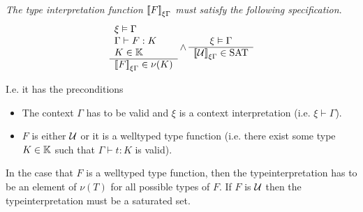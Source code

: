 \begin{definition}
    \label{SpecificationTypeInterpretation}
    \emph{The type interpretation function ${{{[\![} F {]\!]}}_{\xi\Gamma}}$ must
    satisfy the following specification}.
    $$
    \begin{array}{l} 
        \xi \vDash \Gamma
        \\
        \Gamma \vdash F : K
        \\
        K \in \mathbb{K}
     \\ \hline 
        {{{[\![}F {]\!]}}_{\xi\Gamma}} \in \nu(K)
    \end{array}
    \land
    \begin{array}{c} 
        \xi \vDash \Gamma
     \\ \hline 
        {{{[\![}{\cal U}{]\!]}}_{\xi\Gamma}} \in \text{SAT}
    \end{array}
    $$

    I.e. it has the preconditions
    \begin{itemize}
    \item The context $\Gamma$ has to be valid and $\xi$ is a context
        interpretation (i.e. $\xi \vdash \Gamma$).

    \item $F$ is either ${\cal U}$ or it is a welltyped type function (i.e. there
        exist some type $K \in \mathbb{K}$ such that $\Gamma \vdash t : K$ is
            valid).
    \end{itemize}

    In the case that $F$ is a welltyped type function, then the
    typeinterpretation has to be an element of $\nu(T)$ for all possible types
    of $F$. If $F$ is ${\cal U}$
    then the typeinterpretation must be a saturated set.
\end{definition}


